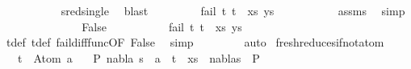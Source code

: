 \begin{isabellebody}
\ \ \ \ \ \ \ \ \ \isamarkupfalse%
\ sred{\isacharunderscore}{\kern0pt}single\ \isamarkupfalse%
\ blast\isanewline
\ \ \ \ \ \ \ \isamarkupfalse%
\ {\isachardoublequoteopen}fail\ {\isacharparenleft}{\kern0pt}{\isacharparenleft}{\kern0pt}t{}{\isacharcomma}{\kern0pt}\ t{}{\isacharparenright}{\kern0pt}\ {\isacharhash}{\kern0pt}\ xs{\isacharcomma}{\kern0pt}\ ys{\isacharparenright}{\kern0pt}{\isachardoublequoteclose}\isanewline
\ \ \ \ \ \ \ \ \ \isamarkupfalse%
\ assms\ \isamarkupfalse%
\ simp\isanewline
\ \ \ \ \ \isamarkupfalse%
\isanewline
\ \ \ \ \ \ \ \isamarkupfalse%
\ False\isanewline
\ \ \ \ \ \ \ \isamarkupfalse%
\ \isamarkupfalse%
\ {\isachardoublequoteopen}fail\ {\isacharparenleft}{\kern0pt}{\isacharparenleft}{\kern0pt}t{}{\isacharcomma}{\kern0pt}\ t{}{\isacharparenright}{\kern0pt}\ {\isacharhash}{\kern0pt}\ xs{\isacharcomma}{\kern0pt}\ ys{\isacharparenright}{\kern0pt}{\isachardoublequoteclose}\isanewline
\ \ \ \ \ \ \ \ \ \isamarkupfalse%
\ t{}{\isacharunderscore}{\kern0pt}def\ t{}{\isacharunderscore}{\kern0pt}def\ fail{\isacharunderscore}{\kern0pt}diff{\isacharunderscore}{\kern0pt}func{\isacharbrackleft}{\kern0pt}OF\ False{\isacharbrackright}{\kern0pt}\ \isamarkupfalse%
\ simp\isanewline
\ \ \ \ \ \isamarkupfalse%
\isanewline
\ \ \isamarkupfalse%
{\isacharparenleft}{\kern0pt}auto{\isacharparenright}{\kern0pt}\isanewline
{}\isamarkupfalse%
%
\endisatagproof
{\isafoldproof}%
%
\isadelimproof
\isanewline
%
\endisadelimproof
\isanewline
\isanewline
{}\isamarkupfalse%
\ fresh{\isacharunderscore}{\kern0pt}reduces{\isacharunderscore}{\kern0pt}if{\isacharunderscore}{\kern0pt}not{\isacharunderscore}{\kern0pt}atom{\isacharcolon}{\kern0pt}\isanewline
\ \ \ {\isachardoublequoteopen}t\ {\isasymnoteq}\ Atom\ a{\isachardoublequoteclose}\isanewline
\ \ \ {\isachardoublequoteopen}{\isasymexists}P{}\ nabla\ s{\isachardot}{\kern0pt}\ {\isacharparenleft}{\kern0pt}{\isacharbrackleft}{\kern0pt}{\isacharbrackright}{\kern0pt}{\isacharcomma}{\kern0pt}\ {\isacharparenleft}{\kern0pt}a\ {\isasymsharp}{\isacharquery}{\kern0pt}\ t{\isacharparenright}{\kern0pt}\ {\isacharhash}{\kern0pt}\ xs{\isacharparenright}{\kern0pt}\ {\isasymTurnstile}\ {\isacharparenleft}{\kern0pt}nabla{\isacharcomma}{\kern0pt}s{\isacharparenright}{\kern0pt}\ {\isasymRightarrow}\ P{}{\isachardoublequoteclose}\isanewline

\end{isabellebody}

